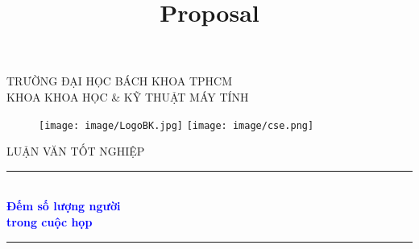 \documentclass[12pt,a4paper]{article}
\title{Proposal}
\begin{document}
\usetikzlibrary{arrows,chains,positioning,scopes}


\begin{titlepage}

	\newcommand{\HRule}{\rule{\linewidth}{0.5mm}} %

	\center %

	\begin{flushright}
	\end{flushright}
	{\Large TRƯỜNG ĐẠI HỌC BÁCH KHOA TPHCM\\
		KHOA KHOA HỌC \& KỸ THUẬT MÁY TÍNH\\}
		\begin{figure}[H]
			\centering
			\texttt{[image: image/LogoBK.jpg]}
			\texttt{[image: image/cse.png]}
		\end{figure}
		\textsc{\huge \color{red} LUẬN VĂN TỐT NGHIỆP}\\[0.2cm] %

		\HRule \\[0.4cm]
		{ \huge \bfseries \textcolor{blue}{Đếm số lượng người \\ trong cuộc họp}}\\[0.4cm] %
		\HRule \\[0.4cm]

		\begin{flushright}
			\begin{minipage}{0.7\textwidth}

			\end{minipage}
		\end{flushright}


\end{titlepage}
\end{document}
